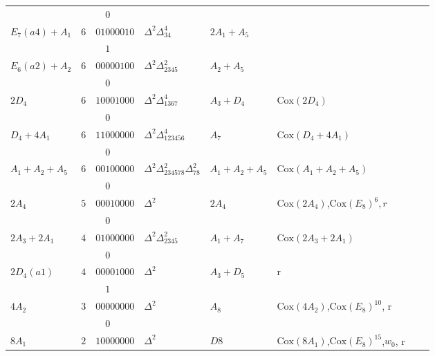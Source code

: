 \documentclass[10pt,leqno]{article}
\newcommand{\cox}{\text{Cox}}
\begin{document}
\begin{tabular}{|l|l|l|l|l|l|l|l|}
        &      &          $\phantom{11}0$&&&\\
$E_7(a4)+A_1$ & $6$  &$01000010$ & $\Delta^2\Delta_{34}^{4}$ & $2A_1+A_5$ & \\\hline
        &      &          $\phantom{11}1$&&&\\
$E_6(a2)+A_2$ & $6$  &$00000100$ & $\Delta^2\Delta_{2345}^{2}$ & $A_2+A_5$ & \\\hline
        &      &          $\phantom{11}0$&&&\\
$2D_4$ & $6$  &$10001000$ & $\Delta^2\Delta_{1367}^{4}$ & $A_3+D_4$ & $\cox(2D_4)$\\\hline
        &      &          $\phantom{11}0$&&&\\
$D_4+4A_1$ & $6$  &$11000000$ & $\Delta^2\Delta_{123456}^{4}$ & $A_7$ & $\cox(D_4+4A_1)$\\\hline
        &      &          $\phantom{11}0$&&&\\
$A_1+A_2+A_5$ & $6$  &$00100000$ & $\Delta^2\Delta_{234578}^{2}\Delta_{78}^{2}$ & $A_1+A_2+A_5$ & $\cox(A_1+A_2+A_5)$\\\hline
        &      &          $\phantom{11}0$&&&\\
$2A_4$ & $5$  &$00010000$ & $\Delta^2$ & $2A_4$ & $\cox(2A_4)$,$\cox(E_8)^6,r$\\\hline
        &      &          $\phantom{11}0$&&&\\
$2A_3+2A_1$ &  $4$ &$01000000$ & $\Delta^2\Delta_{2345}^{2}$ & $A_1+A_7$ & $\cox(2A_3+2A_1)$\\\hline
        &      &          $\phantom{11}0$&&&\\
$2D_4(a1)$ & $4$  & $00001000$ & $\Delta^2$ & $A_3+D_5$ &r \\\hline
        &      &          $\phantom{11}1$&&&\\
$4A_2$ & $3$  &$00000000$ & $\Delta^2$ & $A_8$ & $\cox(4A_2)$,$\cox(E_8)^{10}$, r\\\hline
        &      &          $\phantom{11}0$&&&\\  
$8A_1$ & $2$ &$10000000$ & $\Delta^2$ & $D8$ & $\cox(8A_1)$,$\cox(E_8)^{15}$,$w_0$, r\\\hline
\end{tabular}
\end{document}
